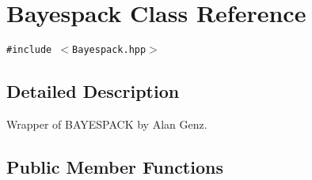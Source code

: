 \hypertarget{classBayespack}{
\section{Bayespack Class Reference}
\label{classBayespack}
}
{\tt \#include $<$Bayespack.hpp$>$}



\subsection{Detailed Description}
Wrapper of BAYESPACK by Alan Genz. 

\subsection*{Public Member Functions}
